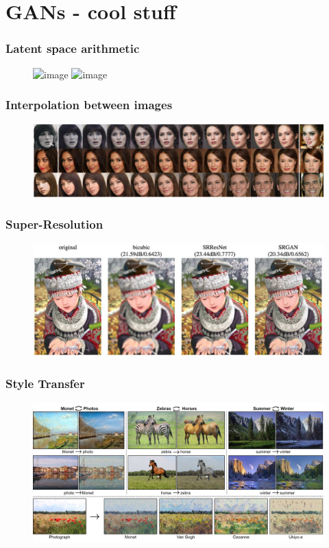 \documentclass{Bredelebeamer}
\begin{document}
\section{GANs - cool stuff}
\begin{frame}
	\frametitle{Latent space arithmetic}
	\begin{figure}[h!]
	\centering
	\includegraphics<1>[width=\textwidth]{vector_space_arithmetic.png}
	\includegraphics<2>[width=0.9\textwidth]{vector_space_arithmetic_2.png}
	\end{figure}
\end{frame}
\begin{frame}
	\frametitle{Interpolation between images}
	\begin{figure}[h!]
	\centering
	\includegraphics[width=\textwidth]{began_interpolation.png}
	\end{figure}
\end{frame}
\begin{frame}
	\frametitle{Super-Resolution}
	\begin{figure}[h!]
	\centering
	\includegraphics[width=\textwidth]{superresolution.jpg}
	\end{figure}
\end{frame}
\begin{frame}
	\frametitle{Style Transfer}
	\begin{figure}[h!]
	\centering
	\includegraphics[width=\textwidth]{cyclegan_style_transfer.jpg}
	\end{figure}
	\href{https://www.youtube.com/watch?v=9reHvktowLY}{}
\end{frame}
\end{document}
